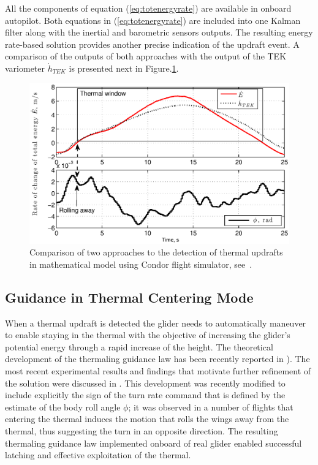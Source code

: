 \documentclass{ifacconf}
\newcommand{\squeezeup}{\vspace{-2.0mm}}
\begin{document}
All the components of equation (\ref{eq:totenergyrate}) are available in onboard
autopilot. Both equations in (\ref{eq:totenergyrate}) are included into one Kalman filter
along with the inertial and barometric sensors outputs. The resulting energy rate-based
solution provides another precise indication of the updraft event. A comparison of the
outputs of both approaches with the output  of the TEK variometer $\dot{h}_{TEK}$ is
presented next in Figure.\ref{fig:ThermalDetection}.
\begin{figure}[thpb]
  \centering
  \includegraphics[scale=0.44]{Figures/TEK_Bank.eps}
  \caption{Comparison of two approaches to the detection of thermal updrafts in mathematical model
  using Condor flight simulator, see~\cite{Condor:2013:Online}. }
  \label{fig:ThermalDetection}
\end{figure}

\subsection{Guidance in Thermal Centering Mode}
\label{subsec:ThermGuidance}
\squeezeup

When a thermal updraft is detected the glider needs to automatically maneuver to enable
staying in the thermal with the objective of increasing the glider's potential energy
through a rapid increase of the height. The theoretical development of the thermaling
guidance law has been recently reported in \cite{AKlass_JGCD:2012}). The most recent
experimental results and findings that motivate further refinement of the solution were
discussed in \cite{AKlass_CDC:2012}. This development was recently modified to include
explicitly the sign of the turn rate command that is defined by the estimate of the body
roll angle $\phi$; it was observed in a number of flights that entering the thermal
induces the motion that rolls the wings away from the thermal, thus suggesting the turn
in an opposite direction. The resulting thermaling guidance law implemented onboard of
real glider enabled successful latching and effective exploitation of the thermal.
\end{document}

